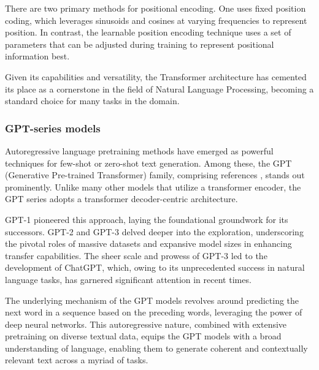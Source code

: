 \documentclass[preprint,12pt,authoryear]{elsarticle}
\begin{document}
There are two primary methods for positional encoding. One uses fixed position coding, which leverages sinusoids and cosines at varying frequencies to represent position. In contrast, the learnable position encoding technique uses a set of parameters that can be adjusted during training to represent positional information best.\cite{93_transformer}

Given its capabilities and versatility, the Transformer architecture has cemented its place as a cornerstone in the field of Natural Language Processing, becoming a standard choice for many tasks in the domain.\cite{88_AIGC_survey} 

\subsubsection{GPT-series models}

Autoregressive language pretraining methods have emerged as powerful techniques for few-shot or zero-shot text generation. Among these, the GPT (Generative Pre-trained Transformer) family, comprising references \cite{31_GPT,32_GPT,33_GPT}, stands out prominently. Unlike many other models that utilize a transformer encoder, the GPT series adopts a transformer decoder-centric architecture.


GPT-1 \cite{31_GPT} pioneered this approach, laying the foundational groundwork for its successors. GPT-2 \cite{32_GPT} and GPT-3 \cite{33_GPT} delved deeper into the exploration, underscoring the pivotal roles of massive datasets and expansive model sizes in enhancing transfer capabilities. The sheer scale and prowess of GPT-3 led to the development of ChatGPT\cite{94_Chatgpt}, which, owing to its unprecedented success in natural language tasks, has garnered significant attention in recent times.

The underlying mechanism of the GPT models revolves around predicting the next word in a sequence based on the preceding words, leveraging the power of deep neural networks. This autoregressive nature, combined with extensive pretraining on diverse textual data, equips the GPT models with a broad understanding of language, enabling them to generate coherent and contextually relevant text across a myriad of tasks.
\end{document}

